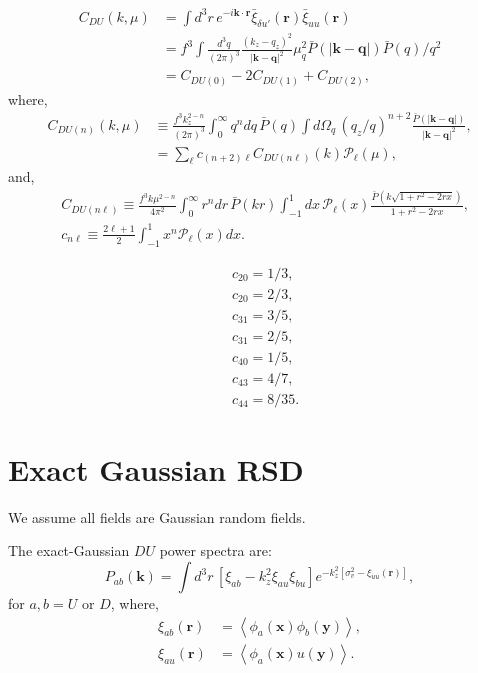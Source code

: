 \documentclass[a4paper,11pt, fleqn]{article}
\begin{document}
\begin{align}
  C_{DU}(k, \mu) &= \int \! d^3 r \, e^{-i\bm{k}\cdot\bm{r}}
                    \bar{\xi}_{\delta u'}(\bm{r}) \bar{\xi}_{uu}(\bm{r})\\
                 &= f^3 \int \!\frac{d^3 q}{(2\pi)^3}
                    \frac{(k_z - q_z)^2}{|\bm{k} - \bm{q}|^2} \mu_q^2
              \bar{P}\left(|\bm{k} - \bm{q}|\right) \bar{P}(q)/q^2\\
  &= C_{DU(0)} - 2 C_{DU(1)} + C_{DU(2)},
\end{align}
where,
\begin{align}
  C_{DU(n)}(k, \mu)
    &\equiv \frac{f^3 k_z^{2 - n}}{(2\pi)^3}
              \int_0^\infty\! q^n dq \, \bar{P}(q) \int \!d\Omega_q \,
              (q_z/q)^{n + 2}
              \frac{\bar{P}\left( | \bm{k} - \bm{q} |\right)}{|\bm{k} - \bm{q}|^2},\\
    &= \sum_\ell c_{(n+2)\ell} C_{DU(n\ell)}(k) \mathcal{P}_\ell(\mu),
\end{align}
and,
\begin{align}
  &C_{DU(n\ell)} \equiv
    \frac{f^3 k \mu^{2 - n}}{4\pi^2} \int_0^\infty \! r^n dr \, \bar{P}(kr)
    \int_{-1}^1 \!dx \,
    \mathcal{P}_\ell(x)
    \frac{\bar{P}\left(k \sqrt{1 + r^2 - 2rx}\right)}{1 + r^2 -2rx},\\
    &c_{n\ell} \equiv \frac{2\ell + 1}{2}
                     \int_{-1}^1 x^n \mathcal{P}_\ell(x) dx.
\end{align}

\begin{equation}\begin{split}
  &c_{20} = 1/3,\\
  &c_{20} = 2/3,\\
  &c_{31} = 3/5,\\
  &c_{31} = 2/5,\\
  &c_{40} = 1/5,\\
  &c_{43} = 4/7,\\
  &c_{44} = 8/35.
\end{split}\end{equation}

%
%
\clearpage
\section{Exact Gaussian RSD}

We assume all fields are Gaussian random fields.

The exact-Gaussian $DU$ power spectra are:
%
\begin{equation}
  P_{ab}(\bm{k}) = \int\! d^3 r \,
  \left[ \xi_{ab} - k_z^2 \xi_{au}\xi_{bu} \right]
  e^{-k_z^2 [ \sigma^2_v - \xi_{uu}(\bm{r}) ]},
\end{equation}
%
for $a,b = U \textrm{ or } D$, where,
\begin{align}
  \xi_{ab}(\bm{r}) &=
    \left\langle \phi_a(\bm{x}) \phi_b(\bm{y}) \right\rangle,\\
  \xi_{au}(\bm{r}) &=
    \left\langle \phi_a(\bm{x}) u(\bm{y})\right\rangle.
\end{align}
\end{document}
